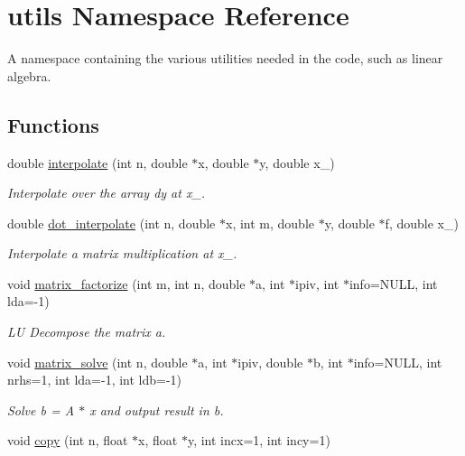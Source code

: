 \hypertarget{namespaceutils}{\section{utils Namespace Reference}
\label{namespaceutils}
}


A namespace containing the various utilities needed in the code, such as linear algebra.  


\subsection*{Functions}
\begin{DoxyCompactItemize}
\item 
double \hyperlink{namespaceutils_abf17f0fd1aabd0f354f78d08d2e685f2}{interpolate} (int n, double $\ast$x, double $\ast$y, double x\-\_)
\begin{DoxyCompactList}\small\item\em Interpolate over the array dy at x\-\_. \end{DoxyCompactList}\item 
double \hyperlink{namespaceutils_a850e14cc48078412f6b35a02381a31c0}{dot\-\_\-interpolate} (int n, double $\ast$x, int m, double $\ast$y, double $\ast$f, double x\-\_)
\begin{DoxyCompactList}\small\item\em Interpolate a matrix multiplication at x\-\_. \end{DoxyCompactList}\item 
void \hyperlink{namespaceutils_ac33776257194ff4afac9cb455d437e37}{matrix\-\_\-factorize} (int m, int n, double $\ast$a, int $\ast$ipiv, int $\ast$info=N\-U\-L\-L, int lda=-\/1)
\begin{DoxyCompactList}\small\item\em L\-U Decompose the matrix a. \end{DoxyCompactList}\item 
void \hyperlink{namespaceutils_a8aa3da9d5c69032bee818d0a0d5c59bc}{matrix\-\_\-solve} (int n, double $\ast$a, int $\ast$ipiv, double $\ast$b, int $\ast$info=N\-U\-L\-L, int nrhs=1, int lda=-\/1, int ldb=-\/1)
\begin{DoxyCompactList}\small\item\em Solve b = A $\ast$ x and output result in b. \end{DoxyCompactList}\item 
void \hyperlink{namespaceutils_abed0c18a9dc4509e784b7598f03bde7d}{copy} (int n, float $\ast$x, float $\ast$y, int incx=1, int incy=1)

\end{DoxyCompactItemize}
